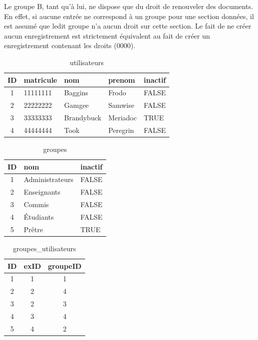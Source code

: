 \documentclass[letter, 11pt, draft]{report}
\begin{document}
Le groupe B, tant qu'à lui, ne dispose que du droit de renouveler des documents. En effet, si aucune entrée ne correspond à un groupe pour une section données, il est assumé que ledit groupe n'a aucun droit sur cette section. Le fait de ne créer aucun enregistrement est strictement équivalent au fait de créer un enregistrement contenant les droits (0000).

\begin{table}[h!]
	\caption{utilisateurs}
	\begin{center}
		\begin{tabular}{|c|l|l|l|l|}
			\hline
			ID & matricule & nom         & prenom   & inactif \\
			\hline
			1  & 11111111  & Baggins     & Frodo    & FALSE \\
			2  & 22222222  & Gamgee      & Samwise  & FALSE \\
			3  & 33333333  & Brandybuck  & Meriadoc & TRUE \\
			4  & 44444444  & Took        & Peregrin & FALSE \\
			\hline
		\end{tabular}
	\end{center}
\end{table}

\begin{table}[h!]
	\caption{groupes}
	\begin{center}
		\begin{tabular}{|c|l|l|}
			\hline
			ID & nom               & inactif \\
			\hline
			1  & Administrateurs   & FALSE \\
			2  & Enseignants       & FALSE \\
			3  & Commis            & FALSE \\
			4  & Étudiants         & FALSE \\
			5  & Prêtre            & TRUE \\
			\hline
		\end{tabular}
	\end{center}
\end{table}

\begin{table}[h!]
	\caption{groupes\_utilisateurs}
	\begin{center}
		\begin{tabular}{|c|c|c|}
			\hline
			ID & exID & groupeID \\
			\hline
			1  & 1    & 1 \\
			2  & 2    & 4 \\
			3  & 2    & 3 \\
			4  & 3    & 4 \\
			5  & 4    & 2 \\
			\hline
		\end{tabular}
	\end{center}
\end{table}
\end{document}
